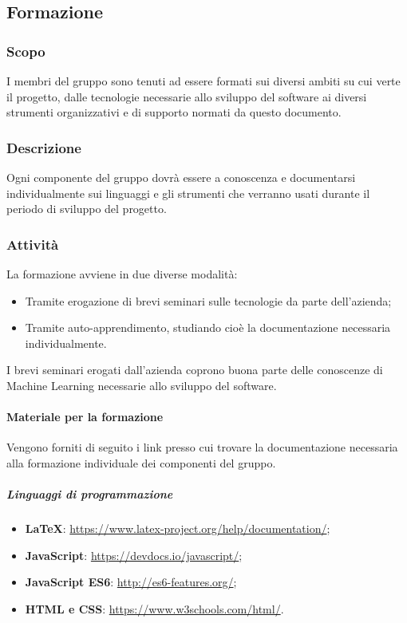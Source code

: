 \documentclass[../norme-di-progetto.tex]{subfiles}
\begin{document}
\subsection{Formazione}
\subsubsection{Scopo}
I membri del gruppo sono tenuti ad essere formati sui diversi ambiti su cui verte il progetto, dalle tecnologie necessarie allo sviluppo del software ai diversi strumenti organizzativi e di supporto normati da questo documento.

\subsubsection{Descrizione}
Ogni componente del gruppo dovrà essere a conoscenza e documentarsi individualmente sui linguaggi e gli strumenti che verranno usati durante il periodo di sviluppo del progetto.

\subsubsection{Attività}
La formazione avviene in due diverse modalità:
\begin{itemize}
  \item Tramite erogazione di brevi seminari sulle tecnologie da parte dell'azienda;
  \item Tramite auto-apprendimento, studiando cioè la documentazione necessaria individualmente.
\end{itemize}
I brevi seminari erogati dall'azienda coprono buona parte delle conoscenze di Machine Learning necessarie allo sviluppo del software.
\paragraph{Materiale per la formazione}
Vengono forniti di seguito i link presso cui trovare la documentazione necessaria alla formazione individuale dei componenti del gruppo.

\subparagraph*{Linguaggi di programmazione}
\begin{itemize}
  \item \textbf{\LaTeX}: \href{https://www.latex-project.org/help/documentation/}{https://www.latex-project.org/help/documentation/};
  \item \textbf{JavaScript}: \href{https://devdocs.io/javascript/}{https://devdocs.io/javascript/};
  \item \textbf{JavaScript ES6}: \href{http://es6-features.org/}{http://es6-features.org/};
  \item \textbf{HTML e CSS}: \href{https://www.w3schools.com/html/}{https://www.w3schools.com/html/}.
\end{itemize}
\end{document}
